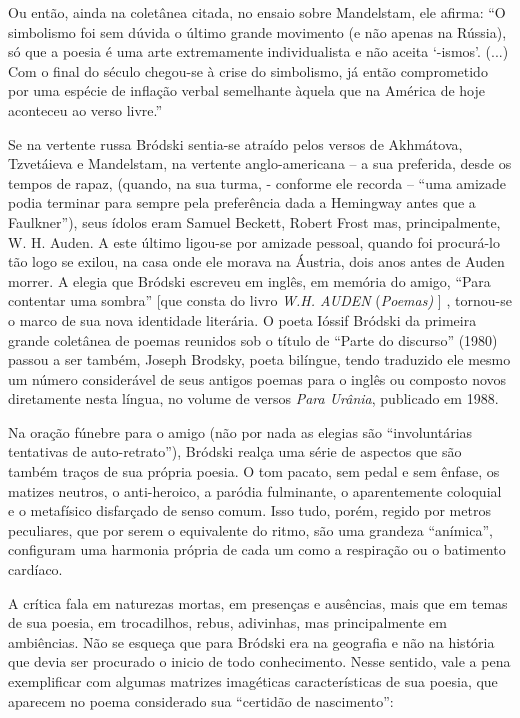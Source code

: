 Ou então, ainda na coletânea citada, no ensaio sobre Mandelstam, ele
afirma: ``O simbolismo foi sem dúvida o último grande movimento (e não
apenas na Rússia), só que a poesia é uma arte extremamente
individualista e não aceita `-ismos'. (...) Com o final do século
chegou-se à crise do simbolismo, já então comprometido por uma espécie
de inflação verbal semelhante àquela que na América de hoje aconteceu ao
verso livre.''

Se na vertente russa Bródski sentia-se atraído pelos versos de
Akhmátova, Tzvetáieva e Mandelstam, na vertente anglo-americana -- a sua
preferida, desde os tempos de rapaz, (quando, na sua turma, - conforme
ele recorda -- ``uma amizade podia terminar para sempre pela preferência
dada a Hemingway antes que a Faulkner''), seus ídolos eram Samuel
Beckett, Robert Frost mas, principalmente, W. H. Auden. A este último
ligou-se por amizade pessoal, quando foi procurá-lo tão logo se exilou,
na casa onde ele morava na Áustria, dois anos antes de Auden morrer. A
elegia que Bródski escreveu em inglês, em memória do amigo, ``Para
contentar uma sombra'' {[}que consta do livro \emph{W.H. AUDEN}
(\emph{Poemas)} {]} , tornou-se o marco de sua nova identidade
literária. O poeta Ióssif Bródski da primeira grande coletânea de poemas
reunidos sob o título de ``Parte do discurso'' (1980) passou a ser
também, Joseph Brodsky, poeta bilíngue, tendo traduzido ele mesmo um
número considerável de seus antigos poemas para o inglês ou composto
novos diretamente nesta língua, no volume de versos \emph{Para Urânia},
publicado em 1988.

Na oração fúnebre para o amigo (não por nada as elegias são
``involuntárias tentativas de auto-retrato''), Bródski realça uma série
de aspectos que são também traços de sua própria poesia. O tom pacato,
sem pedal e sem ênfase, os matizes neutros, o anti-heroico, a paródia
fulminante, o aparentemente coloquial e o metafísico disfarçado de senso
comum. Isso tudo, porém, regido por metros peculiares, que por serem o
equivalente do ritmo, são uma grandeza ``anímica'', configuram uma
harmonia própria de cada um como a respiração ou o batimento cardíaco.

A crítica fala em naturezas mortas, em presenças e ausências, mais que
em temas de sua poesia, em trocadilhos, rebus, adivinhas, mas
principalmente em ambiências. Não se esqueça que para Bródski era na
geografia e não na história que devia ser procurado o inicio de todo
conhecimento. Nesse sentido, vale a pena exemplificar com algumas
matrizes imagéticas características de sua poesia, que aparecem no poema
considerado sua ``certidão de nascimento'':

